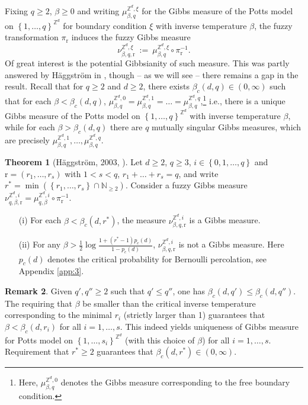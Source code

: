 \documentclass[12pt]{article}
\newcommand{\N}{\mathbb{N}}
\renewcommand{\r}{\mathrm{r}}
\newcommand{\Z}{\mathbb{Z}}
\newcommand{\set}[1]{\left\{#1\right\}}
\newcommand{\1}{\mathbbm{1}}
\newcommand{\5}{\vspace{0.5cm}}
\theoremstyle{definition}
\newtheorem{thm}{Theorem}[section]
\newtheorem{rem}[thm]{Remark}
\begin{document}
Fixing $q\geq 2$, $\beta\geq 0$ and writing $\mu_{\beta,q}^{\Z^d,\xi}$ for the Gibbs measure of the Potts model on $\set{1,\ldots,q}^{\Z^d}$ for boundary condition $\xi$ with inverse temperature $\beta$, the fuzzy transformation $\pi_\r$ induces the fuzzy Gibbs measure 
$$\nu_{\beta,q,\r}^{\Z^d,\xi} ~:=~ \mu_{\beta,q}^{\Z^d,\xi}\circ\pi_\r^{-1}.$$
Of great interest is the potential Gibbsianity of such measure. This was partly answered by H\"aggstr\"om in \cite{Hag}, though -- as we will see -- there remains a gap in the result. Recall that for $q\geq 2$ and $d\geq 2$, there exists $\beta_c(d,q)\in(0,\infty)$ such that for each $\beta<\beta_c(d,q)$, $\mu_{\beta,q}^{\Z^d,0}=\mu_{\beta,q}^{\Z^d,1}=\ldots=\mu_{\beta,q}^{\Z^d,q}$,\footnote{Here, $\mu_{\beta,q}^{\Z^d,0}$ denotes the Gibbs measure corresponding to the free boundary condition.} i.e., there is a unique Gibbs measure of the Potts model on $\set{1,\ldots,q}^{\Z^d}$ with inverse temperature $\beta$, while for each $\beta>\beta_c(d,q)$ there are $q$ mutually singular Gibbs measures, which are precisely $\mu_{\beta,q}^{\Z^d,1},\ldots,\mu_{\beta,q}^{\Z^d,q}$.

\begin{thm}[H\"aggstr\"om, 2003, \cite{Hag}]\label{Haggstrom}
Let $d\geq 2$, $q\geq 3$, $i\in\set{0,1,\ldots,q}$ and $\r=(r_1,\ldots,r_s)$ with $1<s<q$, $r_1+\ldots+r_s=q$, and write $r^*=\min(\set{r_1,\ldots,r_s}\cap\N_{\geq 2})$. Consider a fuzzy Gibbs measure $\nu_{q,\beta,\r}^{\Z^d,i}=\mu_{q,\beta}^{\Z^d,i}\circ\pi_{\r}^{-1}$.
\begin{itemize}
	\item[(i)] For each $\beta<\beta_c(d,r^*)$, the measure $\nu_{\beta,q,\r}^{\Z^d,i}$ is a Gibbs measure.
	\item[(ii)] For any $\beta>\frac{1}{2}\log\frac{1+(r^*-1)p_c(d)}{1-p_c(d)}$, $\nu_{\beta,q,\r}^{\Z^d,i}$ is not a Gibbs measure. Here $p_c(d)$ denotes the critical probability for Bernoulli percolation, see Appendix \ref{app:3}.
\end{itemize}
\end{thm}

\begin{rem}
Given $q',q''\geq 2$ such that $q'\leq q''$, one has $\beta_c(d,q')\leq\beta_c(d,q'')$. The requiring that $\beta$ be smaller than the critical inverse temperature corresponding to the minimal $r_i$ (strictly larger than 1) guarantees that $\beta<\beta_c(d,r_i)$ for all $i=1,\ldots,s$. This indeed yields uniqueness of Gibbs measure for Potts model on $\set{1,\ldots,s_i}^{\Z^d}$ (with this choice of $\beta$) for all $i=1,\ldots,s$. Requirement that $r^*\geq 2$ guarantees that $\beta_c(d,r^*)\in(0,\infty)$.
\end{rem}
\end{document}
